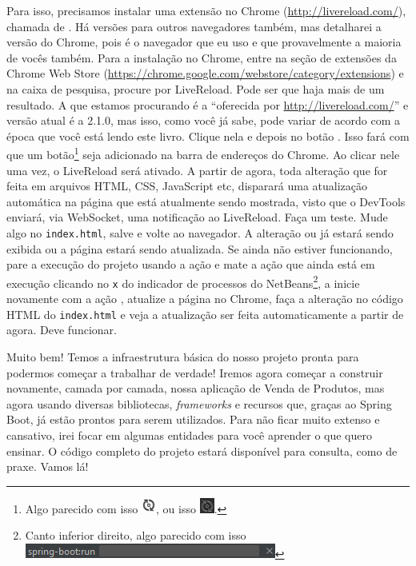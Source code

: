 Para isso, precisamos instalar uma extensão no Chrome (\url{http://livereload.com/}), chamada de . Há versões para outros navegadores também, mas detalharei a versão do Chrome, pois é o navegador que eu uso e que provavelmente a maioria de vocês também. Para a instalação no Chrome, entre na seção de extensões da Chrome Web Store (\url{https://chrome.google.com/webstore/category/extensions}) e na caixa de pesquisa, procure por LiveReload. Pode ser que haja mais de um resultado. A que estamos procurando é a ``oferecida por \url{http://livereload.com/}'' e versão atual é a 2.1.0, mas isso, como você já sabe, pode variar de acordo com a época que você está lendo este livro. Clique nela e depois no botão . Isso fará com que um botão\footnote{Algo parecido com isso \includegraphics[scale=1]{imagens/cap10BotaoLiveReloadBranco}, ou isso \includegraphics[scale=1]{imagens/cap10BotaoLiveReloadPreto}.} seja adicionado na barra de endereços do Chrome. Ao clicar nele uma vez, o LiveReload será ativado. A partir de agora, toda alteração que for feita em arquivos HTML, CSS, JavaScript etc, disparará uma atualização automática na página que está atualmente sendo mostrada, visto que o DevTools enviará, via WebSocket, uma notificação ao LiveReload. Faça um teste. Mude algo no \texttt{index.html}, salve e volte ao navegador. A alteração ou já estará sendo exibida ou a página estará sendo atualizada. Se ainda não estiver funcionando, pare a execução do projeto usando a ação  e mate a ação  que ainda está em execução clicando no \texttt{x} do indicador de processos do NetBeans\footnote{Canto inferior direito, algo parecido com isso \includegraphics[scale=1]{imagens/cap10MatarProcessoSpringBootRun}}, a inicie novamente com a ação , atualize a página no Chrome, faça a alteração no código HTML do \texttt{index.html} e veja a atualização ser feita automaticamente a partir de agora. Deve funcionar.

Muito bem! Temos a infraestrutura básica do nosso projeto pronta para podermos começar a trabalhar de verdade! Iremos agora começar a construir novamente, camada por camada, nossa aplicação de Venda de Produtos, mas agora usando diversas bibliotecas, \textit{frameworks} e recursos que, graças ao Spring Boot, já estão prontos para serem utilizados. Para não ficar muito extenso e cansativo, irei focar em algumas entidades para você aprender o que quero ensinar. O código completo do projeto estará disponível para consulta, como de praxe. Vamos lá!



